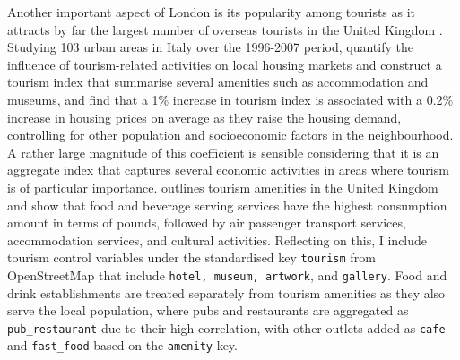 \documentclass{article}
\begin{document}
Another important aspect of London is its popularity among tourists as it attracts by far the largest number of overseas tourists in the United Kingdom \citep{OfficeforNationalStatistics2019OverseasSeries}. Studying 103 urban areas in Italy over the 1996-2007 period, \citet{Biagi2015DoesItaly} quantify the influence of tourism-related activities on local housing markets and construct a tourism index that summarise several amenities such as accommodation and museums, and find that a 1\% increase in tourism index is associated with a 0.2\% increase in housing prices on average as they raise the housing demand, controlling for other population and socioeconomic factors in the neighbourhood. A rather large magnitude of this coefficient is sensible considering that it is an aggregate index that captures several economic activities in areas where tourism is of particular importance. \citet{OfficeforNationalStatistics2013The2009} outlines tourism amenities in the United Kingdom and show that food and beverage serving services have the highest consumption amount in terms of pounds, followed by air passenger transport services, accommodation services, and cultural activities. Reflecting on this, I include tourism control variables under the standardised key \texttt{tourism} from OpenStreetMap that include \texttt{hotel, museum, artwork}, and \texttt{gallery}. Food and drink establishments are treated separately from tourism amenities as they also serve the local population, where pubs and restaurants are aggregated as \texttt{pub\_restaurant} due to their high correlation, with other outlets added as \texttt{cafe} and \texttt{fast\_food} based on the \texttt{amenity} key.\\\\
\end{document}
